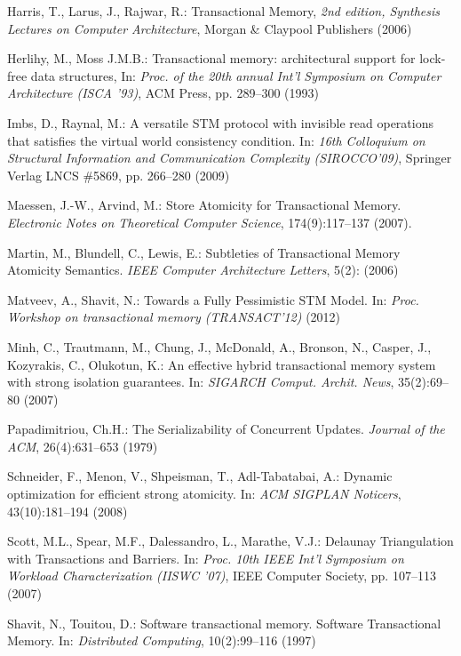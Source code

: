 \begin{thebibliography}{99}
{
 Harris, T.,  Larus, J.,  Rajwar, R.:
Transactional Memory, 
{\it 2nd edition, Synthesis Lectures on Computer Architecture},
Morgan \& Claypool Publishers (2006)

Herlihy, M., Moss J.M.B.: Transactional memory: architectural support for lock-free data structures, 
In: {\it Proc.  of the 20th annual Int'l Symposium on Computer Architecture 
(ISCA '93)}, ACM Press, pp. 289--300 (1993)

Imbs, D., Raynal, M.: 
A versatile   STM protocol with invisible read operations 
that satisfies  the  virtual world consistency condition.
In: {\it   16th  Colloquium   on  Structural   Information   and  Communication Complexity  (SIROCCO'09)}, 
Springer Verlag LNCS   \#5869, pp. 266--280 (2009)

 Maessen, J.-W., Arvind, M.:
 Store Atomicity for Transactional Memory. 
{\it Electronic  Notes  on Theoretical  Computer Science}, 
174(9):117--137 (2007).

 Martin, M.,  Blundell, C., Lewis, E.:
 Subtleties of Transactional Memory Atomicity Semantics. 
{\it IEEE Computer Architecture  Letters},  5(2):  (2006)

Matveev, A.,  Shavit, N.:
Towards a Fully Pessimistic STM Model. 
In: {\it Proc. Workshop on transactional memory (TRANSACT'12)} (2012)

Minh, C., Trautmann, M., Chung, J., McDonald, A., Bronson, N., Casper, J., Kozyrakis, C., Olukotun, K.:
An effective hybrid transactional memory system with strong isolation guarantees.
In: {\it SIGARCH Comput. Archit. News}, 35(2):69--80 (2007)

Papadimitriou, Ch.H.:
The Serializability of Concurrent Updates. 
{\it Journal of the ACM},  26(4):631--653 (1979) 

 Schneider, F., Menon, V., Shpeisman, T., Adl-Tabatabai, A.:
 Dynamic optimization for efficient strong atomicity.
In: {\it ACM  SIGPLAN Noticers}, 43(10):181--194  (2008)

 Scott, M.L.,  Spear, M.F., Dalessandro, L.,   Marathe, V.J.:
 Delaunay Triangulation with Transactions and Barriers. 
In: {\it Proc.  10th IEEE Int'l Symposium on Workload Characterization (IISWC '07)},
 IEEE Computer Society, pp. 107--113 (2007)

 Shavit, N., Touitou, D.: Software transactional memory. 
Software Transactional Memory. 
In: {\it Distributed  Computing}, 10(2):99--116 (1997) 

}
\end{thebibliography}
